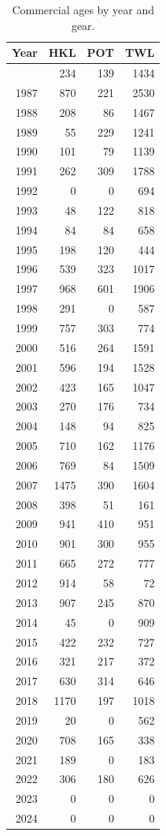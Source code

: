 \documentclass[
]{scrartcl}
\begin{document}
\pagebreak

\begingroup
\fontsize{9.0pt}{10.8pt}\selectfont

\begin{longtable}{rrrr}

\caption{\label{tbl-bds-age-samples}Commercial ages by year and gear.}

\tabularnewline

\toprule
Year & HKL & POT & TWL \\ 
\midrule\addlinespace[2.5pt]
1986 & 234 & 139 & 1434 \\ 
1987 & 870 & 221 & 2530 \\ 
1988 & 208 & 86 & 1467 \\ 
1989 & 55 & 229 & 1241 \\ 
1990 & 101 & 79 & 1139 \\ 
1991 & 262 & 309 & 1788 \\ 
1992 & 0 & 0 & 694 \\ 
1993 & 48 & 122 & 818 \\ 
1994 & 84 & 84 & 658 \\ 
1995 & 198 & 120 & 444 \\ 
1996 & 539 & 323 & 1017 \\ 
1997 & 968 & 601 & 1906 \\ 
1998 & 291 & 0 & 587 \\ 
1999 & 757 & 303 & 774 \\ 
2000 & 516 & 264 & 1591 \\ 
2001 & 596 & 194 & 1528 \\ 
2002 & 423 & 165 & 1047 \\ 
2003 & 270 & 176 & 734 \\ 
2004 & 148 & 94 & 825 \\ 
2005 & 710 & 162 & 1176 \\ 
2006 & 769 & 84 & 1509 \\ 
2007 & 1475 & 390 & 1604 \\ 
2008 & 398 & 51 & 161 \\ 
2009 & 941 & 410 & 951 \\ 
2010 & 901 & 300 & 955 \\ 
2011 & 665 & 272 & 777 \\ 
2012 & 914 & 58 & 72 \\ 
2013 & 907 & 245 & 870 \\ 
2014 & 45 & 0 & 909 \\ 
2015 & 422 & 232 & 727 \\ 
2016 & 321 & 217 & 372 \\ 
2017 & 630 & 314 & 646 \\ 
2018 & 1170 & 197 & 1018 \\ 
2019 & 20 & 0 & 562 \\ 
2020 & 708 & 165 & 338 \\ 
2021 & 189 & 0 & 183 \\ 
2022 & 306 & 180 & 626 \\ 
2023 & 0 & 0 & 0 \\ 
2024 & 0 & 0 & 0 \\ 
\bottomrule

\end{longtable}
\end{document}
